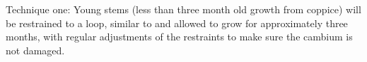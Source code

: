 Technique one: Young stems (less than three month old growth from coppice) will
be restrained to a loop, similar to \citet{jacobs1945l} and allowed to
grow for approximately three months, with regular adjustments of the restraints
to make sure the cambium is not damaged.